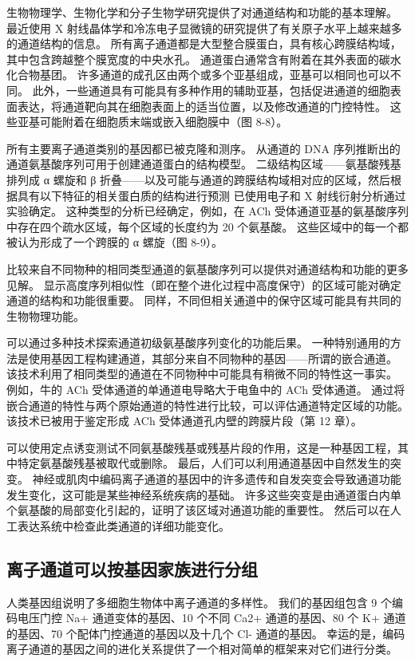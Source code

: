 生物物理学、生物化学和分子生物学研究提供了对通道结构和功能的基本理解。 
最近使用 X 射线晶体学和冷冻电子显微镜的研究提供了有关原子水平上越来越多的通道结构的信息。 
所有离子通道都是大型整合膜蛋白，具有核心跨膜结构域，其中包含跨越整个膜宽度的中央水孔。 
通道蛋白通常含有附着在其外表面的碳水化合物基团。 许多通道的成孔区由两个或多个亚基组成，亚基可以相同也可以不同。 
此外，一些通道具有可能具有多种作用的辅助亚基，包括促进通道的细胞表面表达，将通道靶向其在细胞表面上的适当位置，以及修改通道的门控特性。 
这些亚基可能附着在细胞质末端或嵌入细胞膜中（图 8-8）。


所有主要离子通道类别的基因都已被克隆和测序。 
从通道的 DNA 序列推断出的通道氨基酸序列可用于创建通道蛋白的结构模型。 
二级结构区域——氨基酸残基排列成 α 螺旋和 β 折叠——以及可能与通道的跨膜结构域相对应的区域，然后根据具有以下特征的相关蛋白质的结构进行预测 已使用电子和 X 射线衍射分析通过实验确定。 
这种类型的分析已经确定，例如，在 ACh 受体通道亚基的氨基酸序列中存在四个疏水区域，每个区域的长度约为 20 个氨基酸。 
这些区域中的每一个都被认为形成了一个跨膜的 α 螺旋（图 8-9）。


比较来自不同物种的相同类型通道的氨基酸序列可以提供对通道结构和功能的更多见解。 
显示高度序列相似性（即在整个进化过程中高度保守）的区域可能对确定通道的结构和功能很重要。 
同样，不同但相关通道中的保守区域可能具有共同的生物物理功能。


可以通过多种技术探索通道初级氨基酸序列变化的功能后果。 
一种特别通用的方法是使用基因工程构建通道，其部分来自不同物种的基因——所谓的嵌合通道。 该技术利用了相同类型的通道在不同物种中可能具有稍微不同的特性这一事实。 例如，牛的 ACh 受体通道的单通道电导略大于电鱼中的 ACh 受体通道。 通过将嵌合通道的特性与两个原始通道的特性进行比较，可以评估通道特定区域的功能。 该技术已被用于鉴定形成 ACh 受体通道孔内壁的跨膜片段（第 12 章）。

可以使用定点诱变测试不同氨基酸残基或残基片段的作用，这是一种基因工程，其中特定氨基酸残基被取代或删除。 最后，人们可以利用通道基因中自然发生的突变。 神经或肌肉中编码离子通道的基因中的许多遗传和自发突变会导致通道功能发生变化，这可能是某些神经系统疾病的基础。 许多这些突变是由通道蛋白内单个氨基酸的局部变化引起的，证明了该区域对通道功能的重要性。 然后可以在人工表达系统中检查此类通道的详细功能变化。


\subsection{离子通道可以按基因家族进行分组}
人类基因组说明了多细胞生物体中离子通道的多样性。 我们的基因组包含 9 个编码电压门控 Na+ 通道变体的基因、10 个不同 Ca2+ 通道的基因、80 个 K+ 通道的基因、70 个配体门控通道的基因以及十几个 Cl- 通道的基因。 幸运的是，编码离子通道的基因之间的进化关系提供了一个相对简单的框架来对它们进行分类。

